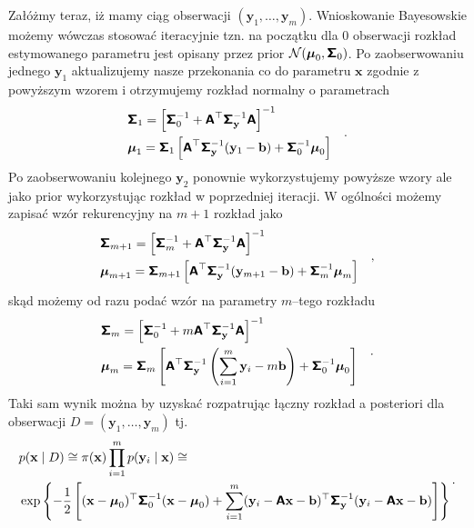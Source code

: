 \documentclass{myclass}
\begin{document}
Załóżmy teraz, iż mamy ciąg obserwacji \((\mathbf{y}_1, \ldots, \mathbf{y}_m)\). Wnioskowanie
Bayesowskie możemy wówczas stosować iteracyjnie tzn. na początku dla 0 obserwacji rozkład
estymowanego parametru jest opisany przez prior \(\mathcal{N}(\boldsymbol{\mu}_0,
\boldsymbol{\mathsf{\Sigma}}_0)\). Po zaobserwowaniu jednego \(\mathbf{y}_1\) aktualizujemy nasze przekonania co do
parametru \(\mathbf{x}\) zgodnie z powyższym wzorem i otrzymujemy rozkład normalny o parametrach
\begin{equation*}
    \begin{split}
        &\boldsymbol{\mathsf{\Sigma}}_1 = \left[\boldsymbol{\mathsf{\Sigma}}_0^{-1} + \boldsymbol{\mathsf{A}}^\top\boldsymbol{\mathsf{\Sigma}}_\mathbf{y}^{-1}\boldsymbol{\mathsf{A}}\right]^{-1}\\
        &\boldsymbol{\mu}_1 = \boldsymbol{\mathsf{\Sigma}}_1\left[\boldsymbol{\mathsf{A}}^\top\boldsymbol{\mathsf{\Sigma}}_\mathbf{y}^{-1}(\mathbf{y}_1 - \mathbf{b}) + \boldsymbol{\mathsf{\Sigma}}_0^{-1}\boldsymbol{\mu}_0\right]
    \end{split}\quad.
\end{equation*}
Po zaobserwowaniu kolejnego \(\mathbf{y}_2\) ponownie wykorzystujemy powyższe wzory ale jako prior
wykorzystując rozkład w poprzedniej iteracji. W ogólności możemy zapisać wzór rekurencyjny na
\(m+1\) rozkład jako
\begin{equation*}
    \begin{split}
        &\boldsymbol{\mathsf{\Sigma}}_{m+1} = \left[\boldsymbol{\mathsf{\Sigma}}_m^{-1} + \boldsymbol{\mathsf{A}}^\top\boldsymbol{\mathsf{\Sigma}}_\mathbf{y}^{-1}\boldsymbol{\mathsf{A}}\right]^{-1}\\
        &\boldsymbol{\mu}_{m+1} = \boldsymbol{\mathsf{\Sigma}}_{m+1}\left[\boldsymbol{\mathsf{A}}^\top\boldsymbol{\mathsf{\Sigma}}_\mathbf{y}^{-1}(\mathbf{y}_{m+1} - \mathbf{b}) + \boldsymbol{\mathsf{\Sigma}}_m^{-1}\boldsymbol{\mu}_m\right]
    \end{split}\quad,
\end{equation*}
skąd możemy od razu podać wzór na parametry \(m\)--tego rozkładu
\begin{equation*}
    \begin{split}
        &\boldsymbol{\mathsf{\Sigma}}_{m} = \left[\boldsymbol{\mathsf{\Sigma}}_0^{-1} + m\boldsymbol{\mathsf{A}}^\top\boldsymbol{\mathsf{\Sigma}}_\mathbf{y}^{-1}\boldsymbol{\mathsf{A}}\right]^{-1}\\
        &\boldsymbol{\mu}_{m} = \boldsymbol{\mathsf{\Sigma}}_{m}\left[\boldsymbol{\mathsf{A}}^\top\boldsymbol{\mathsf{\Sigma}}_\mathbf{y}^{-1}\left(\sum_{i=1}^{m}\mathbf{y}_{i} - m\mathbf{b}\right) + \boldsymbol{\mathsf{\Sigma}}_0^{-1}\boldsymbol{\mu}_0\right]
    \end{split}\quad.
\end{equation*}
Taki sam wynik można by uzyskać rozpatrując łączny rozkład a posteriori dla obserwacji \(D =
(\mathbf{y}_1, \ldots, \mathbf{y}_m)\) tj.
\begin{equation*}
    \begin{split}
        &p(\mathbf{x} \mid D) \cong \pi(\mathbf{x})\prod_{i=1}^m p(\mathbf{y}_i \mid \mathbf{x})\cong \\
        &\exp\left\{-\frac{1}{2}\left[(\mathbf{x}-\boldsymbol{\mu}_0)^\top\boldsymbol{\mathsf{\Sigma}}_0^{-1}(\mathbf{x}-\boldsymbol{\mu}_0) + \sum_{i=1}^m(\mathbf{y}_i - \boldsymbol{\mathsf{A}}\mathbf{x}-\mathbf{b})^\top\boldsymbol{\mathsf{\Sigma}}_\mathbf{y}^{-1}(\mathbf{y}_i - \boldsymbol{\mathsf{A}}\mathbf{x}-\mathbf{b})\right]\right\}
    \end{split}\,.
\end{equation*}
\end{document}
